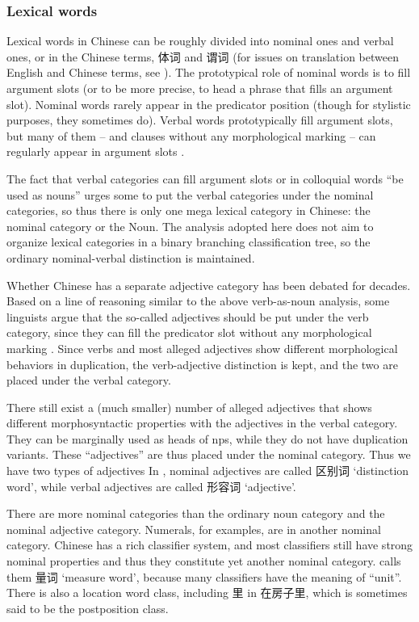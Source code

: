 \documentclass[UTF8, a4paper, oneside, scheme=plain]{ctexart}
\newcommand*{\citesec}[1]{\S~{#1}}
\newcommand{\translate}[1]{`#1'}
\begin{document}
\subsubsection{Lexical words}

Lexical words in Chinese can be roughly divided into nominal ones and verbal ones,
or in the Chinese terms, 体词 and 谓词
(for issues on translation between English and Chinese terms, see ).
The prototypical role of nominal words 
is to fill argument slots (or to be more precise, to head a phrase that fills an argument slot).
Nominal words rarely appear in the predicator position
(though for stylistic purposes, they sometimes do).
Verbal words prototypically fill argument slots,
but many of them -- and clauses without any morphological marking -- 
can regularly appear in argument slots \citep[\citesec{3.5}]{zhudexigrammar}.

The fact that verbal categories can fill argument slots or in colloquial words ``be used as nouns''
urges some to put the verbal categories under the nominal categories,
so thus there is only one mega lexical category in Chinese:
the nominal category or the Noun.
The analysis adopted here does not aim to organize lexical categories 
in a binary branching classification tree,
so the ordinary nominal-verbal distinction is maintained.

Whether Chinese has a separate adjective category 
has been debated for decades.
Based on a line of reasoning similar to the above verb-as-noun analysis,
some linguists argue that the so-called adjectives should be put under the verb category,
since they can fill the predicator slot without any morphological marking \citep{li1989mandarin}.
Since verbs and most alleged adjectives show different morphological behaviors in duplication, %
the verb-adjective distinction is kept,
and the two are placed under the verbal category.

There still exist a (much smaller) number of alleged adjectives that shows 
different morphosyntactic properties with the adjectives in the verbal category.
They can be marginally used as heads of \ac{np}s,
while they do not have duplication variants.
These ``adjectives'' are thus placed under the nominal category.
Thus we have two types of adjectives
In \citet{zhudexigrammar}, 
nominal adjectives are called 区别词 \translate{distinction word},
while verbal adjectives are called 形容词 \translate{adjective}.

There are more nominal categories than the ordinary noun category and the nominal adjective category.
Numerals, for examples, are in another nominal category.
Chinese has a rich classifier system,
and most classifiers still have strong nominal properties
and thus they constitute yet another nominal category.
\citet{zhudexigrammar} calls them 量词 \translate{measure word},
because many classifiers have the meaning of ``unit''.
There is also a location word class, including 里 in 在房子里,
which is sometimes said to be the postposition class.
\end{document}
